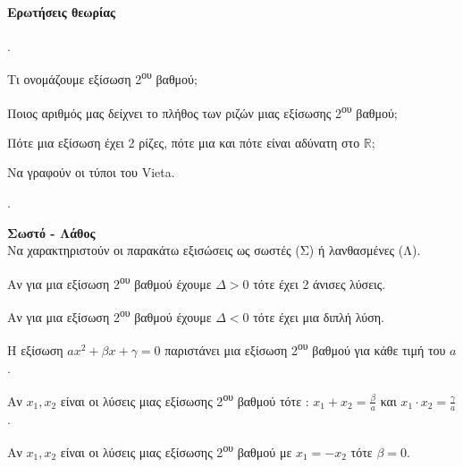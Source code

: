 \documentclass[11pt,a4paper,twocolumn]{article}
\newcounter{askhsh}
\newcommand{\askhsh}{{\large\theaskhsh.}\ \addtocounter{askhsh}{1}}
\begin{document}
\paragraph{Ερωτήσεις θεωρίας}
\askhsh 
\begin{alist}
\item Τι ονομάζουμε εξίσωση 2\textsuperscript{ου} βαθμού;
\item Ποιος αριθμός μας δείχνει το πλήθος των ριζών μιας εξίσωσης 2\textsuperscript{ου} βαθμού;
\item Πότε μια εξίσωση έχει 2 ρίζες, πότε μια και πότε είναι αδύνατη στο $ \mathbb{R} $;
\item Να γραφούν οι τύποι του Vieta.
\end{alist}
\askhsh \textbf{Σωστό - Λάθος}\\
Να χαρακτηριστούν οι παρακάτω εξισώσεις ως σωστές (Σ) ή λανθασμένες (Λ).
\begin{alist}[leftmargin=4mm]
\item Αν για μια εξίσωση 2\textsuperscript{ου} βαθμού έχουμε $ \varDelta>0 $ τότε έχει 2 άνισες λύσεις.
\item Αν για μια εξίσωση 2\textsuperscript{ου} βαθμού έχουμε $ \varDelta<0 $ τότε έχει μια διπλή λύση.
\item Η εξίσωση $ ax^2+\beta x+\gamma=0 $ παριστάνει μια εξίσωση 2\textsuperscript{ου} βαθμού για κάθε τιμή του $ a $.
\item Αν $ x_1, x_2 $ είναι οι λύσεις μιας εξίσωσης 2\textsuperscript{ου} βαθμού τότε : $ x_1+x_2=\frac{\beta}{a} $ και $ x_1\cdot x_2=\frac{\gamma}{a} $.
\item Αν $ x_1, x_2 $ είναι οι λύσεις μιας εξίσωσης 2\textsuperscript{ου} βαθμού με $ x_1=-x_2 $ τότε $ \beta=0 $.
\end{alist}
\end{document}
